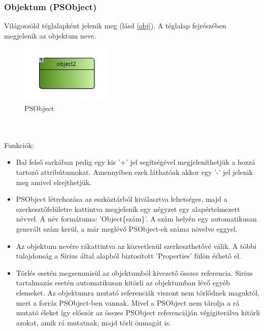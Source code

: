 \subsubsection{Objektum (PSObject)}
Világoszöld téglalapként jelenik meg (lásd \autoref{obj}).  A téglalap fejrészében megjelenik az objektum neve.
\begin{figure}[!ht]
	\centering
	\includegraphics{figures/obj.PNG}
	\caption{PSObject}
	\label{obj} 
\end{figure}
\\\\
Funkciók:
\begin{itemize}  	
	\item Bal felső sarkában pedig egy kis '+' jel segítségével megjeleníthetjük a hozzá tartozó attribútumokat. Amennyiben ezek láthatóak akkor egy '-' jel jelenik meg amivel elrejthetjük. 	
	
	\item PSObject létrehozása az eszköztárból kiválasztva lehetséges, majd a szerkesztőfelületre kattintva megjelenik egy négyzet egy alapértelmezett névvel. A név formátuma: 'Object\{szám\}'. A szám helyén egy automatikusan generált szám kerül, a már meglévő PSObject-ek száma növelve eggyel.

	\item Az objektum nevére rákattintva az közvetlenül szerkeszthetővé válik. A többi tulajdonság a Sirius által alapból biztosított 'Properties' fülön érhető el. 
	
	\item Törlés esetén megsemmisül az objektumból kivezető összes referencia. Sirius tartalmazás esetén automatikusan kitörli az objektumban lévő egyéb elemeket. Az objektumra mutató referenciák viszont nem törlődnek maguktól, mert a forrás PSObject-ben vannak. Mivel a PSObject nem tárolja a rá mutató éleket így először az összes PSObject referenciáján végigiterálva kitörli azokat, amik rá mutatnak, majd törli önmagát is. 
\end{itemize}


